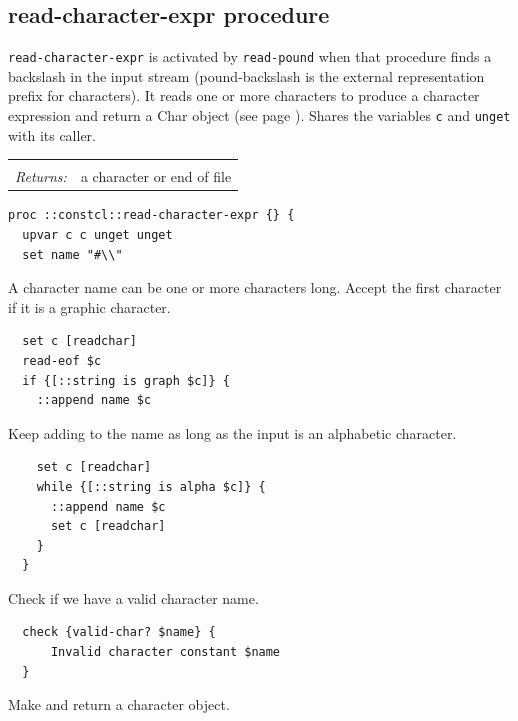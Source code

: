 \documentclass[a5paper,draft]{memoir}
\begin{document}
\subsection{read-character-expr procedure}
\label{readcharacterexpr-procedure}

\texttt{read-character-expr} is activated by \texttt{read-pound} when that procedure finds a backslash in the input stream (pound-backslash is the external representation prefix for characters). It reads one or more characters to produce a character expression and return a Char object (see page \pageref{characters}). Shares the variables \texttt{c} and \texttt{unget} with its caller.

\noindent\begin{tabular}{ |p{1.9cm} p{6.5cm}| }
\hline
\rowcolor[HTML]{CCCCCC} \multicolumn{2}{|l|}{\textbf{read-character-expr (internal)}} \\
\textit{Returns:} & a character or end of file \\
\hline
\end{tabular}

\begin{lstlisting}
proc ::constcl::read-character-expr {} {
  upvar c c unget unget
  set name "#\\"
\end{lstlisting}

A character name can be one or more characters long. Accept the first character if it is a graphic character.

\begin{lstlisting}
  set c [readchar]
  read-eof $c
  if {[::string is graph $c]} {
    ::append name $c
\end{lstlisting}

Keep adding to the name as long as the input is an alphabetic character.

\begin{lstlisting}
    set c [readchar]
    while {[::string is alpha $c]} {
      ::append name $c
      set c [readchar]
    }
  }
\end{lstlisting}

Check if we have a valid character name.

\begin{lstlisting}
  check {valid-char? $name} {
      Invalid character constant $name
  }
\end{lstlisting}

Make and return a character object.
\end{document}
